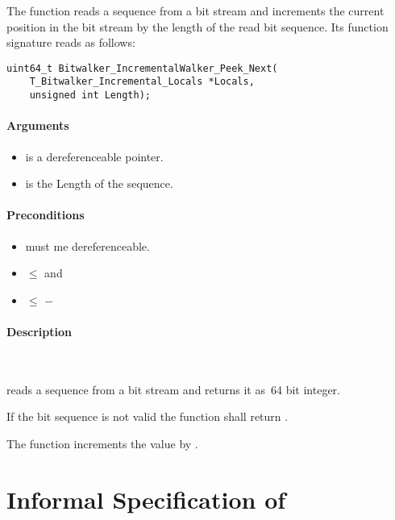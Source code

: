 The function \peeknext reads a sequence from a bit stream 
and increments the current position in the bit stream by the 
length of the read bit sequence.
Its function signature reads as follows:\\[1em]


\begin{lstlisting}[style=acsl-block]
uint64_t Bitwalker_IncrementalWalker_Peek_Next(
    T_Bitwalker_Incremental_Locals *Locals,
    unsigned int Length);
\end{lstlisting}


\paragraph{Arguments}
\begin{itemize}
   \item  {} is a dereferenceable pointer.
   \item {} is the Length of the sequence.
\end{itemize}

\paragraph{Preconditions}
\begin{itemize}
    \item  {} must me dereferenceable.
    \item {} $\leq$  and
    \item {} $\leq$  $-$ 
\end{itemize}

\paragraph{Description}~

\peeknext reads a sequence from a bit stream and returns it as~64 bit integer.


If the bit sequence is not valid the function shall return .

The function increments the value  by .


\clearpage

\section{Informal Specification of }


